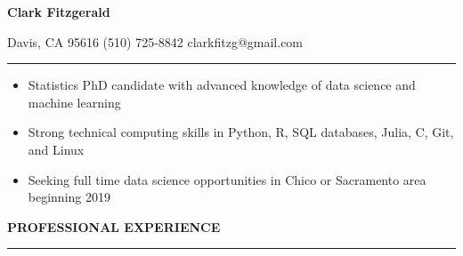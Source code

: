\documentclass{article}
\begin{document}
\begin{center}
{\Large\bf Clark Fitzgerald} 
\end{center}

\hspace{4cm} Davis, CA 95616 \hspace{0.5cm} (510) 725-8842 \hspace{0.5cm} clarkfitzg@gmail.com 

\vspace{0.2cm}
\hrule
\vspace{0.2cm}

\begin{itemize}
  \setlength{\itemsep}{-1pt}

\item Statistics PhD candidate with advanced knowledge of data science
    and machine learning
    
\item Strong technical computing skills in Python, R, SQL databases, Julia,
    C, Git, and Linux

\item Seeking full time data science opportunities in Chico or Sacramento
    area beginning 2019

\end{itemize}

\vspace{0.1 cm}

\textbf{PROFESSIONAL EXPERIENCE}
\vspace{0.2 cm}
\hrule
\vspace{0.1cm}
\end{document}
